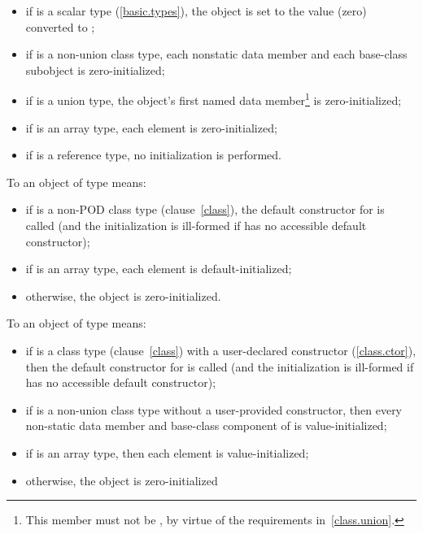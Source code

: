 \begin{itemize}
\item
if
is a scalar type (\ref{basic.types}), the
object
is set to the value
(zero) converted to
;

\item
if
is a non-union class type,
each nonstatic data member and each
base-class subobject is zero-initialized;

\item
if
is a union type,
the
object's first named
data member\footnote{This member must not be , by virtue of
the requirements in~\ref{class.union}.}
is zero-initialized;

\item
if
is an array type,
each element is zero-initialized;
\item
if
is a reference type, no initialization is performed.
\end{itemize}

%
To
an object of type
means:

\begin{itemize}
\item
if
is a non-POD class type (clause~\ref{class}), the default constructor for
is called (and the initialization is ill-formed if
has no accessible default constructor);

\item
if
is an array type, each element is default-initialized;

\item
otherwise, the object is zero-initialized.
\end{itemize}

%
To
an object of type
means:

\begin{itemize}
\item
if
is a class type (clause~\ref{class}) with a user-declared
constructor (\ref{class.ctor}), then the default constructor for
is called (and the initialization is ill-formed if
has no accessible default constructor);

\item
if
is a non-union class type without a user-provided constructor,
then every non-static data member and base-class component of 
is value-initialized;

\item
if
is an array type, then each element is value-initialized;

\item
otherwise, the object is zero-initialized
\end{itemize}

